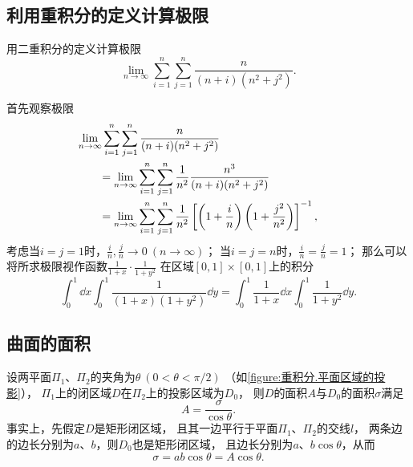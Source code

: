 \subsection{利用重积分的定义计算极限}
\begin{example}
用二重积分的定义计算极限\[
\lim\limits_{n\to\infty} \sum\limits_{i=1}^n \sum\limits_{j=1}^n \frac{n}{(n+i)(n^2+j^2)}.
\]
\begin{solution}
首先观察极限\begin{align*}
	&\hspace{-20pt}
	\lim\limits_{n\to\infty}
		\sum\limits_{i=1}^n
		\sum\limits_{j=1}^n \frac{n}{(n+i)(n^2+j^2)} \\
	&= \lim\limits_{n\to\infty}
		\sum\limits_{i=1}^n
		\sum\limits_{j=1}^n \frac{1}{n^2} \frac{n^3}{(n+i)(n^2+j^2)} \\
	&= \lim\limits_{n\to\infty}
		\sum\limits_{i=1}^n
		\sum\limits_{j=1}^n \frac{1}{n^2}
		\left[
			\left(1+\frac{i}{n}\right)
			\left(1+\frac{j^2}{n^2}\right)
		\right]^{-1},
\end{align*}
考虑当\(i=j=1\)时，\(\frac{i}{n},\frac{j}{n}\to0\ (n\to\infty)\)；
当\(i=j=n\)时，\(\frac{i}{n}=\frac{j}{n}=1\)；
那么可以将所求极限视作函数\(\frac{1}{1+x}\cdot\frac{1}{1+y^2}\)
在区域\([0,1]\times[0,1]\)上的积分\[
	\int_0^1 \dd{x} \int_0^1 \frac{1}{(1+x)(1+y^2)} \dd{y}
	= \int_0^1 \frac{1}{1+x} \dd{x} \int_0^1 \frac{1}{1+y^2} \dd{y}.
\]
\end{solution}
\end{example}

\subsection{曲面的面积}
设两平面\(\Pi_1\)、\(\Pi_2\)的夹角为\(\theta\ (0<\theta<\pi/2)\)
（如\cref{figure:重积分.平面区域的投影}），
\(\Pi_1\)上的闭区域\(D\)在\(\Pi_2\)上的投影区域为\(D_0\)，
则\(D\)的面积\(A\)与\(D_0\)的面积\(\sigma\)满足\[
	A = \frac{\sigma}{\cos\theta}.
\]
事实上，先假定\(D\)是矩形闭区域，
且其一边平行于平面\(\Pi_1\)、\(\Pi_2\)的交线\(l\)，
两条边的边长分别为\(a\)、\(b\)，则\(D_0\)也是矩形闭区域，
且边长分别为\(a\)、\(b \cos\theta\)，从而\[
	\sigma = ab\cos\theta = A \cos\theta.
\]

